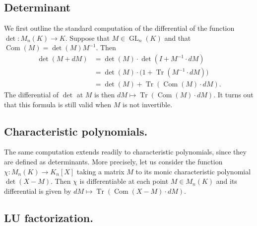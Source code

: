 \documentclass{sig-alternate}
\DeclareMathOperator{\GL}{GL}
\DeclareMathOperator{\tr}{Tr}
\DeclareMathOperator{\com}{Com}
\begin{document}
{\color{Bittersweet}

\subsection{Determinant}

We first outline the standard computation of the differential of the function
$\det : M_n(K) \to K$. Suppose that $M \in \GL_n(K)$ and that $\com(M) = \det(M) M^{-1}$.
Then
\begin{align*}
\det(M + dM) &= \det(M) \cdot \det(I + M^{-1} \cdot dM)  \\
&= \det(M) \cdot \big(1 + \tr(M^{-1} \cdot dM)\big) \\
&= \det(M) + \tr(\com(M) \cdot dM).
\end{align*}
The differential of $\det$ at $M$ is then $dM \mapsto \tr(\com(M) \cdot dM)$. It turns
out that this formula is still valid when $M$ is not invertible.

\subsection{Characteristic polynomials.}

The same computation extends readily to characteristic polynomials,
since they are defined as determinants. More precisely, let us 
consider the function $\chi : M_n(K) \to K_n[X]$ taking a matrix 
$M$ to its monic characteristic polynomial $\det(X-M)$.
Then $\chi$ is differentiable at each point $M \in M_n(K)$ and its 
differential is given by $dM \mapsto \tr(\com(X{-}M) \cdot dM)$.

\subsection*{LU factorization.}

}
\end{document}
